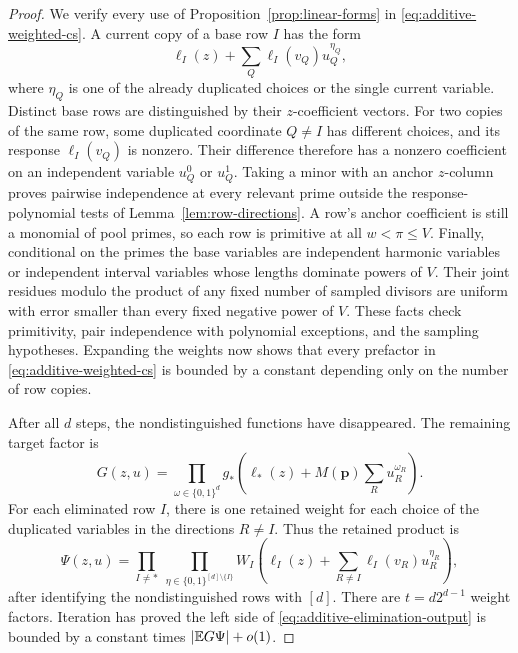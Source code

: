 \begin{proof}
We verify every use of Proposition~\ref{prop:linear-forms} in
\eqref{eq:additive-weighted-cs}.  A current copy of a base row $I$ has
the form
\[
 \ell_I(z)+\sum_Q\ell_I(v_Q)u_Q^{\eta_Q},
\]
where $\eta_Q$ is one of the already duplicated choices or the single
current variable.  Distinct base rows are distinguished by their
$z$-coefficient vectors.  For two copies of the same row, some
duplicated coordinate $Q\ne I$ has different choices, and its response
$\ell_I(v_Q)$ is nonzero.  Their difference therefore has a nonzero
coefficient on an independent variable $u_Q^0$ or $u_Q^1$.
Taking a minor with an anchor $z$-column proves pairwise independence
at every relevant prime outside the response-polynomial tests of
Lemma~\ref{lem:row-directions}.  A row's anchor coefficient is still
a monomial of pool primes, so each row is primitive at all
$w<\pi\le V$.  Finally, conditional on the primes the base variables
are independent harmonic variables or independent interval variables
whose lengths dominate powers of $V$.  Their joint residues modulo
the product of any fixed number of sampled divisors are uniform with
error smaller than every fixed negative power of $V$.
These facts check primitivity, pair independence with polynomial
exceptions, and the sampling hypotheses.  Expanding the weights now
shows that every prefactor in \eqref{eq:additive-weighted-cs} is bounded
by a constant depending only on the number of row copies.

After all $d$ steps, the nondistinguished functions have disappeared.
The remaining target factor is
\[
 G(z,u)=\prod_{\omega\in\{0,1\}^d}
 g_*\left(\ell_*(z)+M(\boldsymbol p)
                   \sum_Ru_R^{\omega_R}\right).
\]
For each eliminated row $I$, there is one retained weight for each
choice of the duplicated variables in the directions $R\ne I$.
Thus the retained product is
\begin{equation}
 \Psi(z,u)=
 \prod_{I\ne *}\ \prod_{\eta\in\{0,1\}^{[d]\setminus\{I\}}}
 W_I\left(\ell_I(z)+\sum_{R\ne I}\ell_I(v_R)u_R^{\eta_R}\right),
 \label{eq:correlation-retained-weights}
\end{equation}
after identifying the nondistinguished rows with $[d]$.
There are $t=d2^{d-1}$ weight factors.  Iteration has proved the left
side of \eqref{eq:additive-elimination-output} is bounded by a constant
times $|\mathbb E G\Psi|+o(1)$.


\end{proof}
